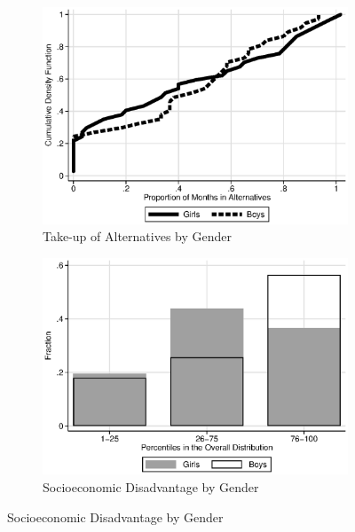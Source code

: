 






\begin{figure}
\centering
\caption{Gender and Socioeconomic Disadvantage in the Control Group} 
\begin{subfigure}[h]{0.45\textwidth}
	\centering
	\caption{Take-up of Alternatives by Gender} 
	\includegraphics[width=\textwidth]{output/abccare_controlcontamination_boysgirls}
\end{subfigure}%
\begin{subfigure}[h]{0.45\textwidth}
	\centering
	\caption{Socioeconomic Disadvantage by Gender} 
	\includegraphics[width=\textwidth]{output/factorbase_girlsboyscompare}
\end{subfigure}

\end{figure}
